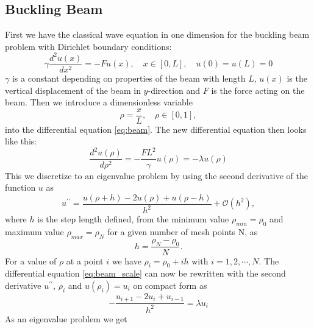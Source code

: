\documentclass[12pt,a4paper,english]{article}
\begin{document}
\subsection{Buckling Beam}
\label{sect:Beam}
First we have the classical wave equation in one dimension for the buckling beam problem with Dirichlet boundary conditions:
\begin{equation}
\label{eq:beam}
\gamma\frac{d^2u(x)}{dx^2}=-Fu(x), \quad x\in[0,L], \quad u(0)=u(L)=0
\end{equation}
$\gamma$ is a constant depending on properties of the beam with length $L$, $u(x)$ is the vertical displacement of the beam in $y$-direction and $F$ is the force acting on the beam. Then we introduce a dimensionless variable
\begin{equation*}
\rho=\frac{x}{L},\quad \rho\in[0,1],
\end{equation*}
into the differential equation \ref{eq:beam}. The new differential equation then looks like this:
\begin{equation}
\label{eq:beam_scale}
\frac{d^2u(\rho)}{d\rho^2}=-\frac{FL^2}{\gamma}u(\rho)=-\lambda u(\rho)
\end{equation}
This we discretize to an eigenvalue problem by using the second derivative of the function $u$ as
\begin{equation*}
\label{eq:u_2deriv}
u^{\prime\prime}=\frac{u(\rho+h)-2u(\rho)+u(\rho-h)}{h^2}+\mathcal{O}(h^2),
\end{equation*}
where $h$ is the step length defined, from the minimum value $\rho_{min}=\rho_0$ and maximum value $\rho_{max}=\rho_N$ for a given number of mesh points N, as
\begin{equation*}
h = \frac{\rho_N-\rho_0}{N}.
\end{equation*}
For a value of $\rho$ at a point $i$ we have $\rho_i=\rho_0+ih$ with $i=1,2,\cdots,N$. The differential equation \ref{eq:beam_scale} can now be rewritten with the second derivative $u^{\prime\prime}$, $\rho_i$ and $u(\rho_i)=u_i$ on compact form as
\begin{equation}
\label{eq:beam_discr}
-\frac{u_{i+1}-2u_i+u_{i-1}}{h^2}=\lambda u_i
\end{equation} 
As an eigenvalue problem we get
\end{document}
